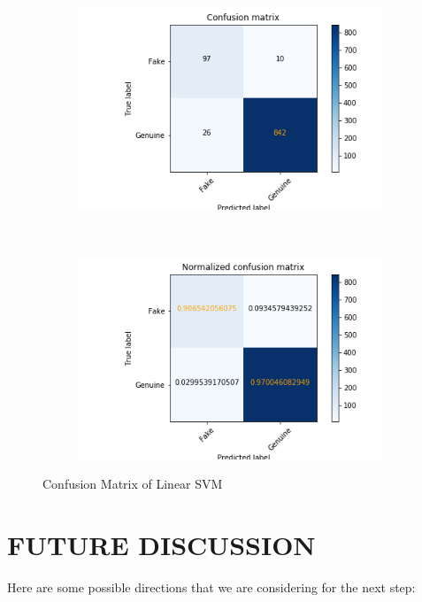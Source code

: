 \documentclass[a4paper, 12pt]{report}
\begin{document}
\begin{figure}[H]
	\centering
	\begin{subfigure}[c]{0.45\linewidth}
		\includegraphics[width =\linewidth
		]{linear_svc_confm_31.png}
	\end{subfigure}
	~
	\begin{subfigure}[c]{0.45\linewidth}
		\includegraphics[width =\linewidth]{linear_svc_confm_32.png}
	\end{subfigure}
	\caption{Confusion Matrix of Linear SVM}
\end{figure}





\section*{FUTURE DISCUSSION}
Here are some possible directions that we are considering for the next step:
\end{document}
